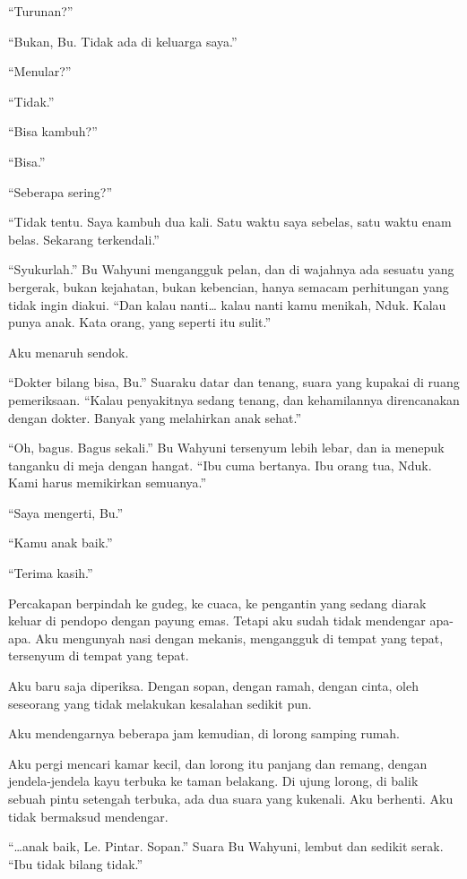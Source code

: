 \documentclass[11pt,twoside,openany]{book}
\makeatletter
\newcommand{\scenebreak}{\par\vspace{0.9em}{\centering\textsc{*\hspace{0.7em}*\hspace{0.7em}*}\par}\vspace{0.9em}\@afterindentfalse\@afterheading}
\makeatother
\begin{document}
``Turunan?''

``Bukan, Bu. Tidak ada di keluarga saya.''

``Menular?''

``Tidak.''

``Bisa kambuh?''

``Bisa.''

``Seberapa sering?''

``Tidak tentu. Saya kambuh dua kali. Satu waktu saya sebelas, satu waktu enam belas. Sekarang terkendali.''

``Syukurlah.'' Bu Wahyuni mengangguk pelan, dan di wajahnya ada sesuatu yang bergerak, bukan kejahatan, bukan kebencian, hanya semacam perhitungan yang tidak ingin diakui. ``Dan kalau nanti\ldots{} kalau nanti kamu menikah, Nduk. Kalau punya anak. Kata orang, yang seperti itu sulit.''

Aku menaruh sendok.

``Dokter bilang bisa, Bu.'' Suaraku datar dan tenang, suara yang kupakai di ruang pemeriksaan. ``Kalau penyakitnya sedang tenang, dan kehamilannya direncanakan dengan dokter. Banyak yang melahirkan anak sehat.''

``Oh, bagus. Bagus sekali.'' Bu Wahyuni tersenyum lebih lebar, dan ia menepuk tanganku di meja dengan hangat. ``Ibu cuma bertanya. Ibu orang tua, Nduk. Kami harus memikirkan semuanya.''

``Saya mengerti, Bu.''

``Kamu anak baik.''

``Terima kasih.''

Percakapan berpindah ke gudeg, ke cuaca, ke pengantin yang sedang diarak keluar di pendopo dengan payung emas. Tetapi aku sudah tidak mendengar apa-apa. Aku mengunyah nasi dengan mekanis, mengangguk di tempat yang tepat, tersenyum di tempat yang tepat.

Aku baru saja diperiksa. Dengan sopan, dengan ramah, dengan cinta, oleh seseorang yang tidak melakukan kesalahan sedikit pun.

\scenebreak
Aku mendengarnya beberapa jam kemudian, di lorong samping rumah.

Aku pergi mencari kamar kecil, dan lorong itu panjang dan remang, dengan jendela-jendela kayu terbuka ke taman belakang. Di ujung lorong, di balik sebuah pintu setengah terbuka, ada dua suara yang kukenali. Aku berhenti. Aku tidak bermaksud mendengar.

``\ldots anak baik, Le. Pintar. Sopan.'' Suara Bu Wahyuni, lembut dan sedikit serak. ``Ibu tidak bilang tidak.''
\end{document}
